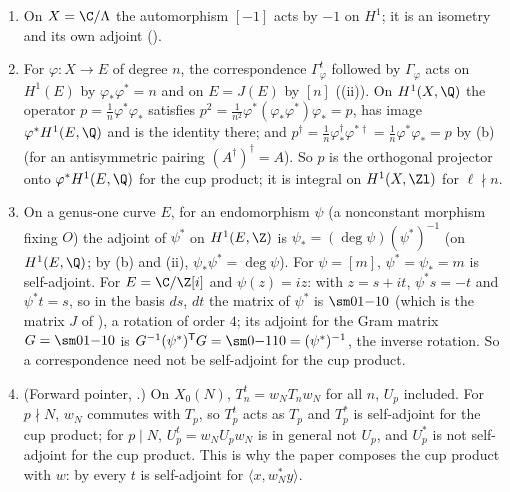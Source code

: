 \begin{example}\label{ex:curves:correspondence-examples}
\leavevmode
\begin{enumerate}[label=(\alph*)]
\item On $X=\C/\Lambda$ the automorphism $[-1]$ acts by $-1$ on $H^1$; it is an isometry and its own adjoint ().
\item For $\varphi\colon X\to E$ of degree $n$, the correspondence $\Gamma_\varphi^t$ followed by $\Gamma_\varphi$ acts on $H^1(E)$ by $\varphi_*\varphi^*=n$ and on $E=J(E)$ by $[n]$
((ii)). On $H^1(X,\Q)$ the operator $p=\frac1n\varphi^*\varphi_*$ satisfies $p^2=\frac1{n^2}\varphi^*(\varphi_*\varphi^*)\varphi_*=p$, has image $\varphi^*H^1(E,\Q)$
and is the identity there; and $p^\dagger=\frac1n\varphi_*^\dagger\varphi^{*\dagger}=\frac1n\varphi^*\varphi_*=p$ by (b) (for an antisymmetric pairing
$(A^\dagger)^\dagger=A$). So $p$ is the orthogonal projector onto $\varphi^*H^1(E,\Q)$ for the cup product; it is integral on $H^1(X,\Zl)$ for $\ell\nmid n$.
\item On a genus-one curve $E$, for an endomorphism $\psi$ (a nonconstant morphism fixing $O$) the adjoint of $\psi^*$ on $H^1(E,\Z)$ is $\psi_*=(\deg\psi)(\psi^*)^{-1}$ (on $H^1(E,\Q)$;
by (b) and (ii), $\psi_*\psi^*=\deg\psi$). For $\psi=[m]$, $\psi^*=\psi_*=m$ is self-adjoint. For $E=\C/\Z[i]$ and
$\psi(z)=iz$: with $z=s+it$, $\psi^*s=-t$ and $\psi^*t=s$, so in the basis $ds$, $dt$ the matrix of $\psi^*$ is $\sm01{-1}0$ (which is the matrix $J$ of ),
a rotation of order $4$; its adjoint for the Gram matrix $G=\sm01{-1}0$ is $G^{-1}(\psi^*)^{\mathsf T}G=\sm0{-1}10=(\psi^*)^{-1}$, the inverse rotation. So a correspondence need not
be self-adjoint for the cup product.
\item (Forward pointer, .) On $X_0(N)$, $T_n^t=w_NT_nw_N$ for all $n$, $U_p$ included. For $p\nmid N$, $w_N$ commutes with $T_p$, so $T_p^t$ acts as $T_p$ and $T_p^*$ is
self-adjoint for the cup product; for $p\mid N$, $U_p^t=w_NU_pw_N$ is in general not $U_p$, and $U_p^*$ is not self-adjoint for the cup product. This is why the paper composes the
cup product with $w$: by  every $t$ is self-adjoint for $\langle x,w_N^*y\rangle$.
\end{enumerate}
\end{example}

